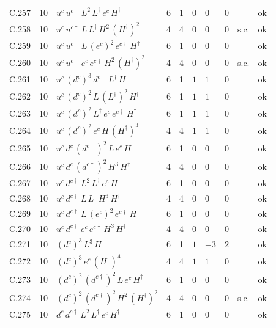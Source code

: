 {\begin{longtable}{@{}ll>{\raggedright\arraybackslash}p{6.4cm}rrllllr@{}}
C.257 & 10 & $u^c\,u^{c\dagger}\,L^{2}\,L^\dagger\,e^c\,H^\dagger$ & 6 & 1 & $0$ & $0$ & $0$ &  & ok \\
C.258 & 10 & $u^c\,u^{c\dagger}\,L\,L^\dagger\,H^{2}\,(H^\dagger)^{2}$ & 4 & 4 & $0$ & $0$ & $0$ & s.c. & ok \\
C.259 & 10 & $u^c\,u^{c\dagger}\,L\,(e^c)^{2}\,e^{c\dagger}\,H^\dagger$ & 6 & 1 & $0$ & $0$ & $0$ &  & ok \\
C.260 & 10 & $u^c\,u^{c\dagger}\,e^c\,e^{c\dagger}\,H^{2}\,(H^\dagger)^{2}$ & 4 & 4 & $0$ & $0$ & $0$ & s.c. & ok \\
C.261 & 10 & $u^c\,(d^c)^{3}\,d^{c\dagger}\,L^\dagger\,H^\dagger$ & 6 & 1 & $1$ & $1$ & $0$ &  & ok \\
C.262 & 10 & $u^c\,(d^c)^{2}\,L\,(L^\dagger)^{2}\,H^\dagger$ & 6 & 1 & $1$ & $1$ & $0$ &  & ok \\
C.263 & 10 & $u^c\,(d^c)^{2}\,L^\dagger\,e^c\,e^{c\dagger}\,H^\dagger$ & 6 & 1 & $1$ & $1$ & $0$ &  & ok \\
C.264 & 10 & $u^c\,(d^c)^{2}\,e^c\,H\,(H^\dagger)^{3}$ & 4 & 4 & $1$ & $1$ & $0$ &  & ok \\
C.265 & 10 & $u^c\,d^c\,(d^{c\dagger})^{2}\,L\,e^c\,H$ & 6 & 1 & $0$ & $0$ & $0$ &  & ok \\
C.266 & 10 & $u^c\,d^c\,(d^{c\dagger})^{2}\,H^{3}\,H^\dagger$ & 4 & 4 & $0$ & $0$ & $0$ &  & ok \\
C.267 & 10 & $u^c\,d^{c\dagger}\,L^{2}\,L^\dagger\,e^c\,H$ & 6 & 1 & $0$ & $0$ & $0$ &  & ok \\
C.268 & 10 & $u^c\,d^{c\dagger}\,L\,L^\dagger\,H^{3}\,H^\dagger$ & 4 & 4 & $0$ & $0$ & $0$ &  & ok \\
C.269 & 10 & $u^c\,d^{c\dagger}\,L\,(e^c)^{2}\,e^{c\dagger}\,H$ & 6 & 1 & $0$ & $0$ & $0$ &  & ok \\
C.270 & 10 & $u^c\,d^{c\dagger}\,e^c\,e^{c\dagger}\,H^{3}\,H^\dagger$ & 4 & 4 & $0$ & $0$ & $0$ &  & ok \\
C.271 & 10 & $(d^c)^{3}\,L^{3}\,H$ & 6 & 1 & $1$ & $-3$ & $2$ &  & ok \\
C.272 & 10 & $(d^c)^{3}\,e^c\,(H^\dagger)^{4}$ & 4 & 4 & $1$ & $1$ & $0$ &  & ok \\
C.273 & 10 & $(d^c)^{2}\,(d^{c\dagger})^{2}\,L\,e^c\,H^\dagger$ & 6 & 1 & $0$ & $0$ & $0$ &  & ok \\
C.274 & 10 & $(d^c)^{2}\,(d^{c\dagger})^{2}\,H^{2}\,(H^\dagger)^{2}$ & 4 & 4 & $0$ & $0$ & $0$ & s.c. & ok \\
C.275 & 10 & $d^c\,d^{c\dagger}\,L^{2}\,L^\dagger\,e^c\,H^\dagger$ & 6 & 1 & $0$ & $0$ & $0$ &  & ok \\

\end{longtable}}
